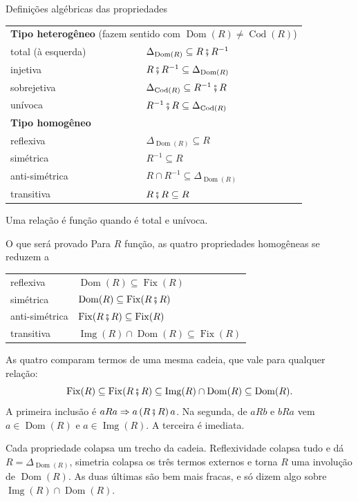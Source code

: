 \documentclass[10pt]{beamer}
\newcommand{\passo}{\onslide<+->}
\newcommand{\diag}[1]{\Delta_{#1}}
\newcommand{\inv}[1]{{#1}^{-1}}
\newcommand{\Fix}{\operatorname{Fix}}
\newcommand{\Img}{\operatorname{Img}}
\newcommand{\Dom}{\operatorname{Dom}}
\newcommand{\Cod}{\operatorname{Cod}}
\newcommand{\comp}{\mathbin{\fatsemi}}
\begin{document}
	\begin{frame}{Definições algébricas das propriedades}
		\passo
		\begin{center}
			\begin{tabular}{ll}
				\multicolumn{2}{l}{\textbf{Tipo heterogêneo} (fazem sentido com $\Dom(R) \neq \Cod(R)$)}\\[2pt]
				total (à esquerda) & $\diag{\Dom(R)} \subseteq R \comp \inv{R}$ \\
				injetiva       & $R \comp \inv{R} \subseteq \diag{\Dom(R)}$ \\
				sobrejetiva    & $\diag{\Cod(R)} \subseteq \inv{R} \comp R$ \\
				unívoca        & $\inv{R} \comp R \subseteq \diag{\Cod(R)}$ \\[8pt]
				\multicolumn{2}{l}{\textbf{Tipo homogêneo}}\\[2pt]
				reflexiva      & $\diag{\Dom(R)} \subseteq R$ \\
				simétrica      & $\inv{R} \subseteq R$ \\
				anti-simétrica & $R \cap \inv{R} \subseteq \diag{\Dom(R)}$ \\
				transitiva     & $R \comp R \subseteq R$
			\end{tabular}
		\end{center}
		
		\medskip
		\passo
		Uma relação é função quando é total e unívoca.
	\end{frame}
	
	\begin{frame}{O que será provado}
		\passo
		Para $R$ função, as quatro propriedades homogêneas se reduzem a
		\begin{center}
			\begin{tabular}{ll}
				reflexiva      & $\Dom(R) \subseteq \Fix(R)$ \\
				simétrica      & $\Dom(R) \subseteq \Fix(R \comp R)$ \\
				anti-simétrica & $\Fix(R \comp R) \subseteq \Fix(R)$ \\
				transitiva     & $\Img(R) \cap \Dom(R) \subseteq \Fix(R)$
			\end{tabular}
		\end{center}
		
		\medskip
		\passo
		As quatro comparam termos de uma mesma cadeia, que vale para qualquer relação:
		\[
		\Fix(R) \subseteq \Fix(R \comp R) \subseteq \Img(R) \cap \Dom(R) \subseteq \Dom(R).
		\]
		\passo
		A primeira inclusão é $aRa \Rightarrow a\,(R \comp R)\,a$. Na segunda, de $aRb$ e $bRa$ vem
		$a \in \Dom(R)$ e $a \in \Img(R)$. A terceira é imediata.
		
		\medskip
		\passo
		Cada propriedade colapsa um trecho da cadeia. Reflexividade colapsa tudo e dá
		$R = \diag{\Dom(R)}$, simetria colapsa os três termos externos e torna $R$ uma involução de
		$\Dom(R)$. As duas últimas são bem mais fracas, e só dizem algo sobre $\Img(R) \cap \Dom(R)$.
	\end{frame}
	
\end{document}
